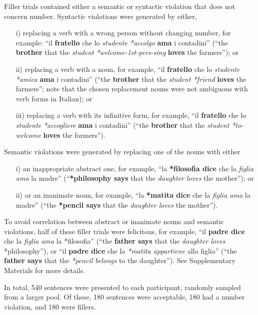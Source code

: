 Filler trials contained either a semantic or syntactic violation that does not concern number. 
Syntactic violations were generated by either, \begin{itemize}\setlength\itemsep{0mm}
\item [i)] replacing a verb with a wrong person without changing number, for example: ``il \textbf{fratello} che lo \emph{studente *accolgo} \textbf{ama} i contadini'' (``the \textbf{brother} that the \emph{student} \emph{*welcome-1st-pers-sing} \textbf{loves} the farmers''); or
\item[ii)] replacing a verb with a noun, for example, ``il \textbf{fratello} che lo \emph{studente} \emph{*amica} \textbf{ama} i contadini'' (``the \textbf{brother} that the \emph{student *friend} \textbf{loves} the farmers''; note that the chosen replacement nouns were not ambiguous with verb forms in Italian); or 
\item[iii)] replacing a verb with its infinitive form, for example, ``il \textbf{fratello} che lo \emph{studente} \emph{*accogliere} \textbf{ama} i contadini'' (``the \textbf{brother} that the \emph{student *to-welcome} \textbf{loves} the farmers''). 
\end{itemize}
Semantic violations were generated by replacing one of the nouns with either\begin{itemize}\setlength\itemsep{0mm}
\item[i)] an inappropriate abstract one, for example, ``la \textbf{*filosofia dice} che la \emph{figlia ama} la madre'' (``\textbf{*philosophy says} that the \emph{daughter loves} the mother''); or
\item[ii)] or an inanimate noun, for example, ``la \textbf{*matita dice} che la \emph{figlia ama} la madre'' (``the \textbf{*pencil says} that the \emph{daughter loves} the mother''). 
\end{itemize}

To avoid correlation between abstract or inanimate nouns and semantic violations, half of these filler trials were felicitous, for example, ``il \textbf{padre dice} che la \emph{figlia ama} la *filosofia'' (``the \textbf{father says} that the \emph{daughter loves} *philosophy''), or ``il \textbf{padre dice} che la \emph{*matita appartiene} alla figlia'' (``the \textbf{father says} that the \emph{*pencil belongs} to the daughter''). 
See Supplementary Materials for more details.

In total, 540 sentences were presented to each participant, randomly sampled from a larger pool. Of these, 180 sentences were acceptable, 180 had a number violation, and 180 were fillers.


